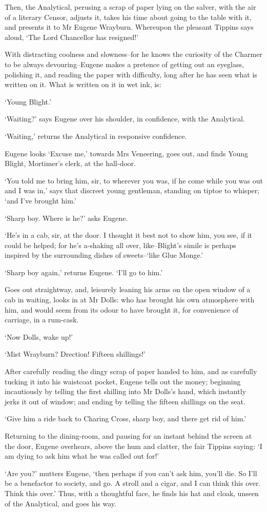 Then, the Analytical, perusing a scrap of paper lying on the salver,
with the air of a literary Censor, adjusts it, takes his time about
going to the table with it, and presents it to Mr Eugene Wrayburn.
Whereupon the pleasant Tippins says aloud, ‘The Lord Chancellor has
resigned!’

With distracting coolness and slowness--for he knows the curiosity of
the Charmer to be always devouring--Eugene makes a pretence of getting
out an eyeglass, polishing it, and reading the paper with difficulty,
long after he has seen what is written on it. What is written on it in
wet ink, is:

‘Young Blight.’

‘Waiting?’ says Eugene over his shoulder, in confidence, with the
Analytical.

‘Waiting,’ returns the Analytical in responsive confidence.

Eugene looks ‘Excuse me,’ towards Mrs Veneering, goes out, and finds
Young Blight, Mortimer’s clerk, at the hall-door.

‘You told me to bring him, sir, to wherever you was, if he come while
you was out and I was in,’ says that discreet young gentleman, standing
on tiptoe to whisper; ‘and I’ve brought him.’

‘Sharp boy. Where is he?’ asks Eugene.

‘He’s in a cab, sir, at the door. I thought it best not to show him, you
see, if it could be helped; for he’s a-shaking all over, like--Blight’s
simile is perhaps inspired by the surrounding dishes of sweets--‘like
Glue Monge.’

‘Sharp boy again,’ returns Eugene. ‘I’ll go to him.’

Goes out straightway, and, leisurely leaning his arms on the open window
of a cab in waiting, looks in at Mr Dolls: who has brought his own
atmosphere with him, and would seem from its odour to have brought it,
for convenience of carriage, in a rum-cask.

‘Now Dolls, wake up!’

‘Mist Wrayburn? Drection! Fifteen shillings!’

After carefully reading the dingy scrap of paper handed to him, and as
carefully tucking it into his waistcoat pocket, Eugene tells out the
money; beginning incautiously by telling the first shilling into Mr
Dolls’s hand, which instantly jerks it out of window; and ending by
telling the fifteen shillings on the seat.

‘Give him a ride back to Charing Cross, sharp boy, and there get rid of
him.’

Returning to the dining-room, and pausing for an instant behind the
screen at the door, Eugene overhears, above the hum and clatter, the
fair Tippins saying: ‘I am dying to ask him what he was called out for!’

‘Are you?’ mutters Eugene, ‘then perhaps if you can’t ask him, you’ll
die. So I’ll be a benefactor to society, and go. A stroll and a cigar,
and I can think this over. Think this over.’ Thus, with a thoughtful
face, he finds his hat and cloak, unseen of the Analytical, and goes his
way.




